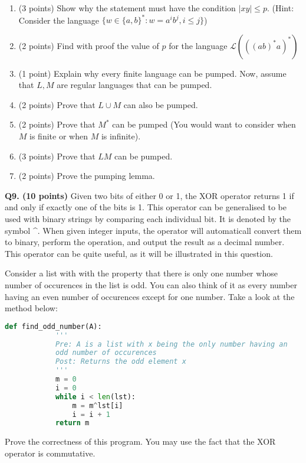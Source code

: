 \documentclass{article}
\begin{document}
    \begin{enumerate}[label=\alph*)]
        \item (3 points) Show why the statement must have the condition \(|xy| \leq p\). (Hint: Consider the language \(\{w \in \{a, b\}^* : w = a^i b^j , i \leq j\}\))
        \vfill
        \item (2 points) Find with proof the value of \(p\) for the language \(\mathcal{L}(((ab)^*a)^*)\) 
        \vfill
        \item (1 point) Explain why every finite language can be pumped.
        \vfill
        \pagebreak
        Now, assume that \(L,M\) are regular languages that can be pumped.
        
        \item (2 points) Prove that \(L \cup M\) can also be pumped.
        \vfill
        \item (2 points) Prove that \(M^*\) can be pumped (You would want to consider when \(M\) is finite or when \(M\) is infinite).
        \vfill
        \pagebreak
        \item (3 points) Prove that \(LM\) can be pumped.
        \vfill
        \item (2 points) Prove the pumping lemma.
        \vfill
    \end{enumerate}

    \pagebreak

    \textbf{Q9. (10 points)} Given two bits of either 0 or 1, the XOR operator returns 1 if and only if exactly one of the bits is 1. This operator can be generalised to be used with binary strings by comparing each individual bit. It is denoted by the symbol \^{}. When given integer inputs, the operator will automaticall convert them to binary, perform the operation, and output the result as a decimal number. This operator can be quite useful, as it will be illustrated in this question.

    Consider a list with with the property that there is only one number whose number of occurences in the list is odd. You can also think of it as every number having an even number of occurences except for one number. Take a look at the method below:

    \begin{lstlisting}[language=Python]
        def find_odd_number(A):
            '''
            Pre: A is a list with x being the only number having an
            odd number of occurences
            Post: Returns the odd element x
            '''
            m = 0
            i = 0
            while i < len(lst):
                m = m^lst[i]
                i = i + 1
            return m
    \end{lstlisting}

    \noindent Prove the correctness of this program. You may use the fact that the XOR operator is commutative.
    \vfill
\end{document}

